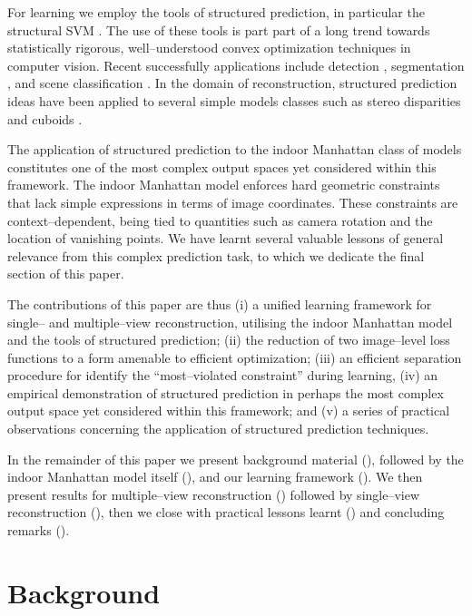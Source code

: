 For learning we employ the tools of structured prediction, in
particular the structural SVM \cite{Tsochantaridis04}. The use of
these tools is part part of a long trend towards statistically
rigorous, well--understood convex optimization techniques in computer
vision. Recent successfully applications include detection
\cite{blaschko2008learning}, segmentation \cite{taskar2004max}, and
scene classification \cite{Yang2010}. In the domain of reconstruction,
structured prediction ideas have been applied to several simple models
classes such as stereo disparities \cite{li2008learning} and cuboids
\cite{Hedau09}.

The application of structured prediction to the indoor Manhattan class
of models constitutes one of the most complex output spaces yet
considered within this framework. The indoor Manhattan model enforces
hard geometric constraints that lack simple expressions in terms of
image coordinates. These constraints are context--dependent, being
tied to quantities such as camera rotation and the location of
vanishing points. We have learnt several valuable lessons of general
relevance from this complex prediction task, to which we dedicate the
final section of this paper.

The contributions of this paper are thus (i) a unified learning
framework for single-- and multiple--view reconstruction, utilising
the indoor Manhattan model and the tools of structured prediction;
(ii) the reduction of two image--level loss functions to a form
amenable to efficient optimization; (iii) an efficient separation
procedure for identify the ``most--violated constraint'' during
learning, (iv) an empirical demonstration of structured prediction in
perhaps the most complex output space yet considered within this
framework; and (v) a series of practical observations concerning the
application of structured prediction techniques.

In the remainder of this paper we present background material
(), followed by the indoor Manhattan model itself
(), and our learning framework (). We
then present results for multiple--view reconstruction
() followed by single--view reconstruction
(), then we close with practical lessons learnt
() and concluding remarks ().

\section{Background}
\label{sec:background}

